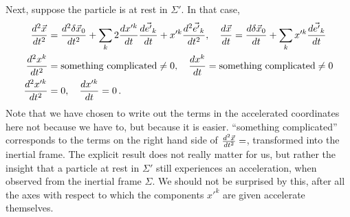\documentclass[../class_mech_main.tex]{subfiles}
\begin{document}
\begin{itemize}
	Next, suppose the particle is at rest in $\Sigma'$. In that case,
	\begin{align*}
		\dv[2]{\vec{x}}{t} &= \dv[2]{\delta \vec{x}_0}{t} + \sum_k 2 \dv{x'^k}{t} \dv{\vec{e'}_k}{t} + x'^k \dv[2]{\vec{e'}_k}{t},
		\quad \dv{\vec{x}}{t} = \dv{\delta \vec{x}_0}{t} + \sum_k x'^k \dv{\vec{e'}_k}{t}
		\\
		\dv[2]{x^k}{t} &= \text{something complicated} \neq 0,
		\quad \dv{x^k}{t} = \text{something complicated} \neq 0
		\\
		\dv[2]{x'^k}{t} &= 0, \quad \dv{x'^k}{t} = 0 \, .
	\end{align*}
	Note that we have chosen to write out the terms in the accelerated coordinates here not because we have to, but because it is easier. \enquote{something complicated} corresponds to the terms on the right hand side of $\dv[2]{\vec{x}}{t} = $, transformed into the inertial frame. The explicit result does not really matter for us, but rather the insight that a particle at rest in $\Sigma'$ still experiences an acceleration, when observed from the inertial frame $\Sigma$. We should not be surprised by this, after all the axes with respect to which the components $x'^k$ are given accelerate themselves.

	


\end{itemize}
\end{document}

